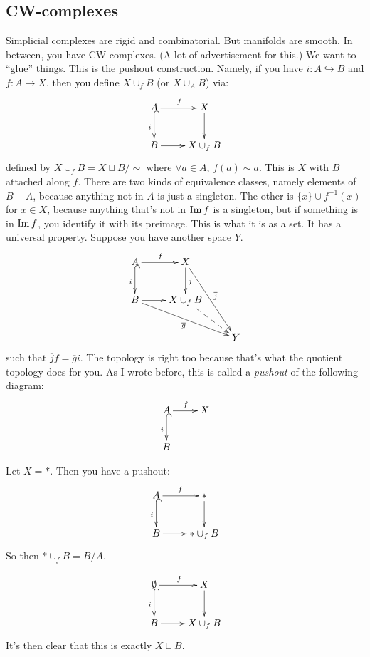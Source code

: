 \subsection{CW-complexes}
Simplicial complexes are rigid and combinatorial. But manifolds are smooth. In between, you have CW-complexes. (A lot of advertisement for this.) We want to ``glue'' things. This is the pushout construction. Namely, if you have $i:A\hookrightarrow B$ and $f:A\to X$, then you define $X\cup_f B$ (or $X\cup_A B$) via:
\begin{equation*}
\xymatrix{A\ar[r]^f\ar@{^(->}[d]_i & X\ar[d]\\
B\ar[r] & X\cup_f B}
\end{equation*}
defined by $X\cup_f B=X\sqcup B/\sim$ where $\forall a\in A$, $f(a)\sim a$. This is $X$ with $B$ attached along $f$. There are two kinds of equivalence classes, namely elements of $B-A$, because anything not in $A$ is just a singleton. The other is $\{x\}\cup f^{-1}(x)$ for $x\in X$, because anything that's not in $\operatorname{Im} f$ is a singleton, but if something is in $\operatorname{Im} f$, you identify it with its preimage. This is what it is as a set. It has a universal property. Suppose you have another space $Y$.
\begin{equation*}
\xymatrix{A\ar[r]^f\ar@{^(->}[d]_i & X\ar[d]^j\ar[ddr]^{\overline{j}} & \\
B\ar[r]\ar[drr]_{\overline{g}} & X\cup_f B\ar@{-->}[dr] & \\
 & & Y}
\end{equation*}
such that $\overline{j}f=\overline{g}i$. The topology is right too because that's what the quotient topology does for you. As I wrote before, this is called a \emph{pushout} of the following diagram:
\begin{equation*}
\xymatrix{A\ar[r]^f\ar@{^(->}[d]_i & X\\
B &}
\end{equation*}
\begin{example}
Let $X=\ast$. Then you have a pushout:
\begin{equation*}
\xymatrix{A\ar[r]^f\ar@{^(->}[d]_i & \ast\ar[d]\\
B\ar[r] & \ast\cup_f B}
\end{equation*}
So then $\ast\cup_f B=B/A$.
\end{example}
\begin{example}
\begin{equation*}
\xymatrix{\emptyset\ar[r]^f\ar@{^(->}[d]_i & X\ar[d]\\
B\ar[r] & X\cup_f B}
\end{equation*}
It's then clear that this is exactly $X\sqcup B$.
\end{example}
